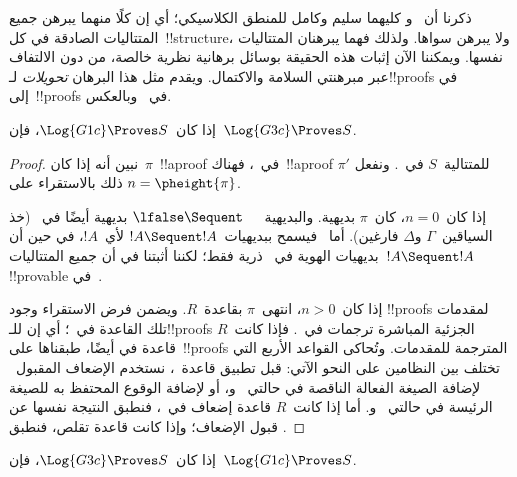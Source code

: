 \documentclass[../../../include/open-logic-section]{subfiles}
\begin{document}


ذكرنا أن~ و كليهما سليم وكامل للمنطق الكلاسيكي؛ أي
إن كلًا منهما يبرهن جميع المتتاليات الصادقة في كل~!!{structure}، ولا
يبرهن سواها. ولذلك فهما يبرهنان المتتاليات نفسها. ويمكننا الآن إثبات هذه
الحقيقة بوسائل برهانية نظرية خالصة، من دون الالتفاف عبر مبرهنتي السلامة
والاكتمال. ويقدم مثل هذا البرهان \emph{تحويلات} لـ!!{proof}s في
 إلى~!!{proof}s في~ وبالعكس.

\begin{prop}
إذا كان~$\Log{G1c}\Proves S$، فإن~$\Log{G3c}\Proves S$.
\end{prop}

\begin{proof}
  نبين أنه إذا كان~$\pi$~!!a{proof} في~، فهناك~!!a{proof}
  $\pi'$ للمتتالية~$S$ في~. ونفعل ذلك بالاستقراء على
  $n=\pheight{\pi}$.

  إذا كان~$n=0$، كان~$\pi$ بديهية. والبديهية~$\lfalse\Sequent\quad$
  بديهية أيضًا في~ (خذ السياقين~$\Gamma$ و$\Delta$ فارغين).
  أما~ فيسمح ببديهيات~$!A\Sequent !A$ لأي~$!A$، في حين أن
  بديهيات الهوية في~ ذرية فقط؛ لكننا أثبتنا في
   أن جميع المتتاليات~$!A\Sequent !A$
  !!{provable} في~.

  إذا كان~$n>0$، انتهى~$\pi$ بقاعدة~$R$. ويضمن فرض الاستقراء وجود
  !!{proof}s لمقدمات تلك القاعدة في~؛ أي إن للـ!!{proof}s
  الجزئية المباشرة ترجمات في~. فإذا كانت~$R$ قاعدة في
   أيضًا، طبقناها على~!!{proof}s المترجمة للمقدمات. وتُحاكى القواعد الأربع
  التي تختلف بين النظامين على النحو الآتي: قبل تطبيق قاعدة~،
  نستخدم الإضعاف المقبول~ لإضافة الصيغة
  الفعالة الناقصة في حالتي~\LeftR{\land} و\RightR{\lor}، أو لإضافة
  الوقوع المحتفظ به للصيغة الرئيسة في حالتي~\LeftR{\lforall}
  و\RightR{\lexists}. أما إذا كانت~$R$ قاعدة إضعاف في~، فنطبق
  النتيجة نفسها عن قبول الإضعاف؛ وإذا كانت قاعدة تقلص، فنطبق
  .
\end{proof}

\begin{prop}
إذا كان~$\Log{G3c}\Proves S$، فإن~$\Log{G1c}\Proves S$.
\end{prop}
\end{document}
